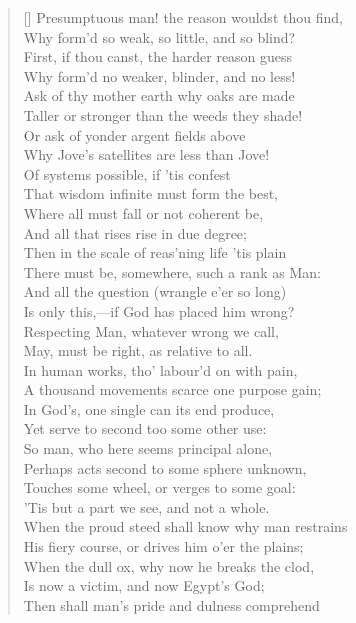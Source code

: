 \begin{verse}[\versewidth]
Presumptuous man! the reason wouldst thou find,\\
Why form'd so weak, so little, and so blind?\\
First, if thou canst, the harder reason guess\\
Why form'd no weaker, blinder, and no less!\\
Ask of thy mother earth why oaks are made\\
Taller or stronger than the weeds they shade!\\
Or ask of yonder argent fields above\\
Why Jove's satellites are less than Jove!\\
\vin Of systems possible, if 'tis confest\\
That wisdom infinite must form the best,\\
Where all must fall or not coherent be,\\
And all that rises rise in due degree;\\
Then in the scale of reas'ning life 'tis plain\\
There must be, somewhere, such a rank as Man:\\
And all the question (wrangle e'er so long)\\
Is only this,---if God has placed him wrong?\\
\vin Respecting Man, whatever wrong we call,\\
May, must be right, as relative to all.\\
In human works, tho' labour'd on with pain,\\
A thousand movements scarce one purpose gain;\\
In God's, one single can its end produce,\\
Yet serve to second too some other use:\\
So man, who here seems principal alone,\\
Perhaps acts second to some sphere unknown,\\
Touches some wheel, or verges to some goal:\\
'Tis but a part we see, and not a whole.\\
\vin When the proud steed shall know why man restrains\\
His fiery course, or drives him o'er the plains;\\
When the dull ox, why now he breaks the clod,\\
Is now a victim, and now Egypt's God;\\
Then shall man's pride and dulness comprehend\\

\end{verse}
